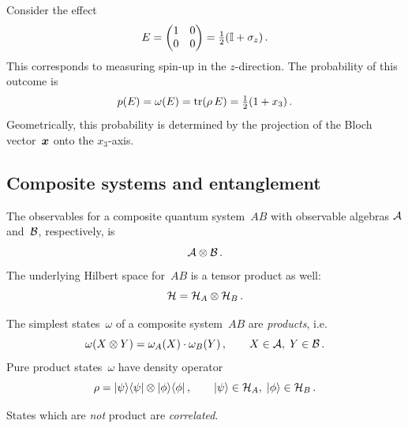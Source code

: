 \begin{example}\label{ex:qubit-effect}
  Consider the effect
  \[
    E = \begin{pmatrix} 1 & 0 \\ 0 & 0 \end{pmatrix}
    = \tfrac{1}{2}(\mathbb{I} + \sigma_z)\,.
  \]
  This corresponds to measuring spin-up in the $z$-direction.  The
  probability of this outcome is
  \[
    p(E) = \omega(E) = \operatorname{tr}(\rho\, E) = \tfrac{1}{2}(1 + x_3)\,.
  \]
  Geometrically, this probability is determined by the projection of the
  Bloch vector~$\boldsymbol{x}$ onto the $x_3$-axis.
\end{example}

\subsection{Composite systems and entanglement}\label{sec:composite}

The observables for a composite quantum system~$AB$ with observable
algebras $\mathcal{A}$ and~$\mathcal{B}$, respectively, is
\begin{equation}\label{eq:composite-alg}
  \mathcal{A} \otimes \mathcal{B}\,.
\end{equation}
The underlying Hilbert space for~$AB$ is a tensor product as well:
\begin{equation}\label{eq:composite-hilb}
  \mathcal{H} = \mathcal{H}_A \otimes \mathcal{H}_B\,.
\end{equation}

The simplest states~$\omega$ of a composite system~$AB$ are
\emph{products}, i.e.\
\begin{equation}\label{eq:product-state}
  \omega(X \otimes Y) = \omega_A(X)\cdot\omega_B(Y)\,,\qquad
  X \in \mathcal{A},\; Y \in \mathcal{B}\,.
\end{equation}
Pure product states~$\omega$ have density operator
\begin{equation}\label{eq:product-density}
  \rho = \lvert \psi \rangle\langle \psi \rvert \otimes \lvert \phi \rangle\langle \phi \rvert\,,\qquad
  \lvert \psi \rangle \in \mathcal{H}_A,\;\lvert \phi \rangle \in \mathcal{H}_B\,.
\end{equation}

States which are \emph{not} product are \emph{correlated}.

